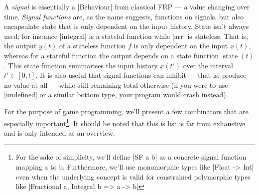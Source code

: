 \documentclass[pdftex,a4paper]{extarticle}
\begin{document}
A \emph{signal} is essentially a |Behaviour| from classical FRP --- a value changing over time.
\emph{Signal functions} are, as the name suggests, functions on signals, but also encapsulate state that is only dependent on the input history. State isn't always used; for instance |integral| is a stateful function while |arr| is stateless. That is, the output \(y(t)\) of a stateless function \(f\) is only dependent on the input \(x(t)\), whereas for a stateful function the output depends on a state function \(\operatorname{state}(t)\). This state function summarises the input history \(x(t')\) over the interval \(t' \in [0,t]\). It is also useful that signal functions can inhibit --- that is, produce no value at all --- while still remaining total otherwise (if you were to use |undefined| or a similar bottom type, your program would crash instead).

For the purpose of game programming, we'll present a few combinators that are especially important\footnote{For the sake of simplicity, we'll define |SF a b| as a concrete signal function mapping a to b. Furthermore, we'll use monomorphic types like |Float -> Int| even when the underlying concept is valid for constrained polymorphic types like |Fractional a, Integral b => a -> b|}. It should be noted that this is list is far from exhaustive and is only intended as an overview.
\end{document}
